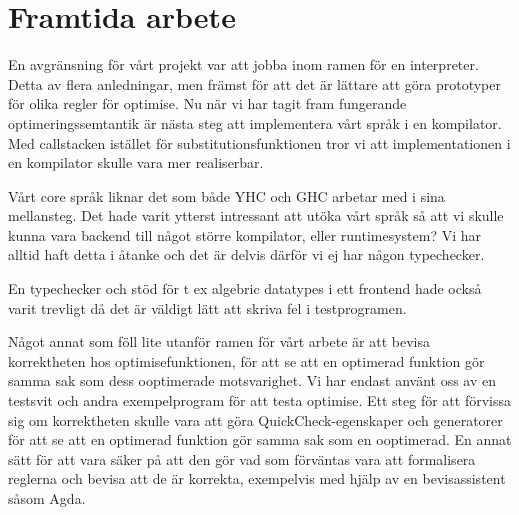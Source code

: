 \documentclass[Rapport]{subfiles}
\begin{document}
\section{Framtida arbete}

En avgränsning för vårt projekt var att jobba inom ramen för en interpreter. 
Detta av flera anledningar, men främst för att det är lättare att göra prototyper för 
olika regler för optimise. Nu när vi har tagit fram fungerande optimeringssemtantik 
är nästa steg att implementera vårt språk i en kompilator.
Med callstacken istället för substitutionsfunktionen tror vi att implementationen
i en kompilator skulle vara mer realiserbar.


Vårt core språk liknar det som både YHC och GHC arbetar med i sina mellansteg.
Det hade varit ytterst intressant att utöka vårt språk så att vi skulle kunna 
vara backend till något större kompilator, eller runtimesystem?
Vi har alltid haft detta i åtanke och det är delvis därför vi ej har någon 
typechecker.




En typechecker och stöd för t ex algebric datatypes i ett frontend hade också
varit trevligt då det är väldigt lätt att skriva fel i testprogramen. 


Något annat som föll lite utanför ramen för vårt arbete är att bevisa
korrektheten hos optimisefunktionen, för att se att en optimerad funktion
gör samma sak som dess ooptimerade motsvarighet. Vi har endast använt oss av en testsvit
och andra exempelprogram för att testa optimise. Ett steg för att förvissa sig
om korrektheten skulle vara att göra QuickCheck-egenskaper och generatorer för att se
att en optimerad funktion gör samma sak som en ooptimerad. En annat sätt för att vara säker på att den
gör vad som förväntas vara att formalisera reglerna och bevisa
att de är korrekta, exempelvis med hjälp av en bevisassistent såsom Agda.
\end{document}
